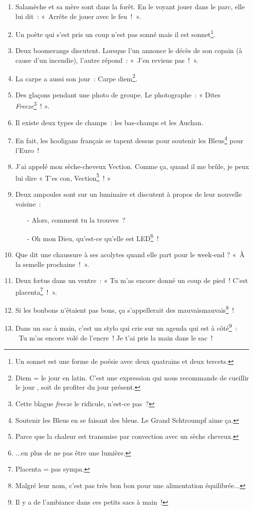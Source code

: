 \documentclass[10pt,a5paper,fullpage]{book}
\begin{document}
\begin{enumerate}
		\item Salamèche et sa mère sont dans la forêt. En le voyant jouer dans le parc, elle lui dit~: «~Arrête de jouer avec le feu~!~».			
		\item Un poète qui s'est pris un coup n'est pas sonné mais il est sonnet\footnote{Un sonnet est une forme de poésie avec deux quatrains et deux tercets.}.
		\item Deux boomerangs discutent. Lorsque l’un annonce le décès de son copain (à cause d’un incendie), l’autre répond~: «~J’en reviens pas~!~».
		\item La carpe a aussi son jour~: Carpe diem\footnote{Diem = le jour en latin. C'est une expression qui nous recommande de \guillemotleft cueillir le jour \guillemotright, soit de profiter du jour présent.}.
		\item Des glaçons pendant une photo de groupe. Le photographe~: « Dites \textit{Freeze}\footnote{Cette blague \textit{freeze} le ridicule, n'est-ce pas~?}~! ».
		\item Il existe deux types de champs~: les bas-champs et les Auchan.
		\item En fait, les hooligans français se tapent dessus pour soutenir les Bleus\footnote{Soutenir les Bleus en se faisant des bleus. Le Grand Schtroumpf aime ça.} pour l’Euro~!
		\item J’ai appelé mon sèche-cheveux Vection. Comme ça, quand il me brûle, je peux lui dire « T’es con, Vection\footnote{Parce que la chaleur est transmise par convection avec un sèche cheveux.}~! »
		\item Deux ampoules sont sur un luminaire et discutent à propos de leur nouvelle voisine~:
		\begin{itemize}
			\item[-] Alors, comment tu la trouves~?
			\item[-] Oh mon Dieu, qu’est-ce qu’elle est LED\footnote{...en plus de ne pas être une lumière.}~!
		\end{itemize}
		\item Que dit une chaussure à ses acolytes quand elle part pour le week-end ? «~À la semelle prochaine~!~».		
		\item Deux fœtus dans un ventre~: « Tu m’as encore donné un coup de pied~! C’est placenta\footnote{Placenta = pas sympa.}~!~».
		\item Si les bonbons n'étaient pas bons, ça s'appellerait des mauvaismauvais\footnote{Malgré leur nom, c'est pas très bon bon pour une alimentation équilibrée...}~! 
		\item Dans un sac à main, c'est un stylo qui crie sur un agenda qui est à côté\footnote{Il y a de l'ambiance dans ces petits sacs à main~!}~: \guillemotleft~Tu m’as encore volé de l’encre~! Je t’ai pris la main dans le sac~!~\guillemotright

\end{enumerate}
\end{document}
